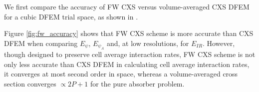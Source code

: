 We first compare the accuracy of FW CXS versus  volume-averaged CXS DFEM for a cubic DFEM trial space, as shown in .  

Figure \ref{fig:fw_accuracy} shows that FW CXS scheme is more accurate than CXS DFEM when comparing $E_{\psi}$, $E_{\psi_A}$ and, at low resolutions, for $E_{IR}$.
However, though designed to preserve cell average interaction rates, FW CXS scheme is not only less accurate than  CXS DFEM in calculating cell average interaction rates, it converges at most second order in space, whereas a volume-averaged cross section converges $\propto 2P+1$ for the pure absorber problem.
